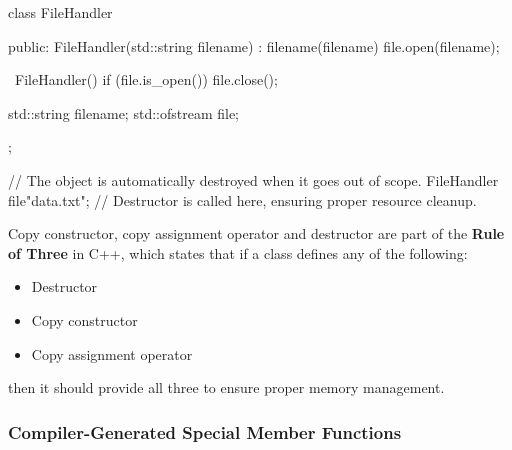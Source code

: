 \vspace{-0.5em}

\begin{codeblock}[language=C++]
class FileHandler {
public:
    FileHandler(std::string filename) : filename(filename) {
        file.open(filename);
    }

    ~FileHandler() {
        if (file.is_open()) {
            file.close();
        }
    }

    std::string filename;
    std::ofstream file;
};

{ // The object is automatically destroyed when it goes out of scope.
    FileHandler file{"data.txt"};
} // Destructor is called here, ensuring proper resource cleanup.
\end{codeblock}

\vspace{-0.7em}

\begin{observationblock}
    Copy constructor, copy assignment operator and destructor are part of the \textbf{Rule of Three} in C++, which states that if a class defines any of the following:
    \begin{itemize}
        \item Destructor
        \item Copy constructor
        \item Copy assignment operator
    \end{itemize}
    then it should provide all three to ensure proper memory management.
\end{observationblock}

\vspace{-0.8em}

\subsubsection{Compiler-Generated Special Member Functions}

\vspace{-1em}

\renewcommand{\arraystretch}{1.35}
\setlength{\tabcolsep}{2.8pt}

